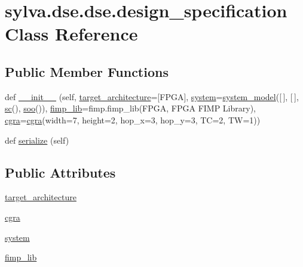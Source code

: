 \hypertarget{classsylva_1_1dse_1_1dse_1_1design__specification}{}\section{sylva.\+dse.\+dse.\+design\+\_\+specification Class Reference}
\label{classsylva_1_1dse_1_1dse_1_1design__specification}
\subsection*{Public Member Functions}
\begin{DoxyCompactItemize}
\item 
def \hyperlink{classsylva_1_1dse_1_1dse_1_1design__specification_a663ec78bf7e1432ce1bcdb32272e5c78}{\+\_\+\+\_\+init\+\_\+\+\_\+} (self, \hyperlink{classsylva_1_1dse_1_1dse_1_1design__specification_abbf25f6a1f9aaa73f5e29885b8bdd8a6}{target\+\_\+architecture}=\mbox{[}\textquotesingle{}F\+P\+GA\textquotesingle{}\mbox{]}, \hyperlink{classsylva_1_1dse_1_1dse_1_1design__specification_a96856cd3116b9f67b8778fc9e3968632}{system}=\hyperlink{classsylva_1_1dse_1_1dse_1_1system__model}{system\+\_\+model}(\mbox{[}$\,$\mbox{]}, \mbox{[}$\,$\mbox{]}, \hyperlink{namespacesylva_1_1dse_1_1dse_ac2d9fdcc3f7fd0bad1900fa0a813dff4}{sc}(), \hyperlink{namespacesylva_1_1dse_1_1dse_ab54fbae03bc2c432fecd4486e623af71}{soo}()), \hyperlink{classsylva_1_1dse_1_1dse_1_1design__specification_a427b7d0d227aa039fd4aa12a5d935ca1}{fimp\+\_\+lib}=fimp.\+fimp\+\_\+lib(\textquotesingle{}F\+P\+GA\textquotesingle{}, \textquotesingle{}F\+P\+GA F\+I\+MP Library\textquotesingle{}), \hyperlink{classsylva_1_1base_1_1cgra_1_1cgra}{cgra}=\hyperlink{classsylva_1_1base_1_1cgra_1_1cgra}{cgra}(width=7, height=2, hop\+\_\+x=3, hop\+\_\+y=3, TC=2, TW=1))
\item 
def \hyperlink{classsylva_1_1dse_1_1dse_1_1design__specification_add24965827d00b11032bd22aa2606169}{serialize} (self)
\end{DoxyCompactItemize}
\subsection*{Public Attributes}
\begin{DoxyCompactItemize}
\item 
\hyperlink{classsylva_1_1dse_1_1dse_1_1design__specification_abbf25f6a1f9aaa73f5e29885b8bdd8a6}{target\+\_\+architecture}
\item 
\hyperlink{classsylva_1_1dse_1_1dse_1_1design__specification_af2a020bde2455890f0bafc6519b65712}{cgra}
\item 
\hyperlink{classsylva_1_1dse_1_1dse_1_1design__specification_a96856cd3116b9f67b8778fc9e3968632}{system}
\item 
\hyperlink{classsylva_1_1dse_1_1dse_1_1design__specification_a427b7d0d227aa039fd4aa12a5d935ca1}{fimp\+\_\+lib}
\end{DoxyCompactItemize}


